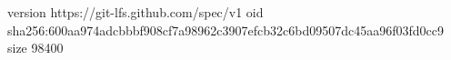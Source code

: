 version https://git-lfs.github.com/spec/v1
oid sha256:600aa974adcbbbf908cf7a98962c3907efcb32c6bd09507dc45aa96f03fd0cc9
size 98400
